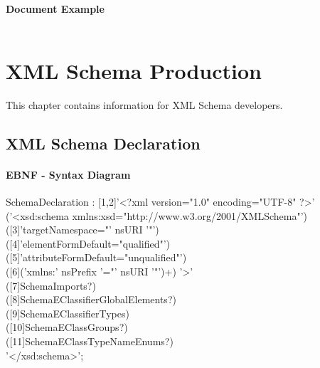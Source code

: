 \documentclass[11pt,a4paper]{article}
\begin{document}
\paragraph{Document Example}
\inputminted[fontsize=\footnotesize]{xml}{examples/EReferenceReferenced1111.xml}


\section{XML Schema Production}
This chapter contains information for XML Schema developers.
\subsection{XML Schema Declaration}
\paragraph{EBNF - Syntax Diagram}
\begin{rail}
SchemaDeclaration :
 [1,2]'<?xml version="1.0" encoding="UTF-8" ?>' \\
('<xsd:schema xmlns:xsd="http://www.w3.org/2001/XMLSchema"') \\
     ([3]'targetNamespace="' nsURI '"') \\
     ([4]'elementFormDefault="qualified"') \\
     ([5]'attributeFormDefault="unqualified"') \\
    ([6]('xmlns:' nsPrefix '="' nsURI '"')+) '>' \\ 
([7]SchemaImports?) \\
([8]SchemaEClassifierGlobalElements?) \\
([9]SchemaEClassifierTypes) \\
([10]SchemaEClassGroups?) \\
([11]SchemaEClassTypeNameEnums?)\\
'</xsd:schema>';
\end{rail}
\end{document}
